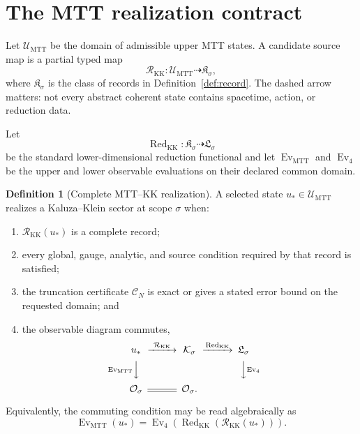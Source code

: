\documentclass[11pt]{article}
\theoremstyle{definition}
\newtheorem{definition}[theorem]{Definition}
\theoremstyle{remark}
\newcommand{\cC}{\mathcal C}
\newcommand{\cK}{\mathcal K}
\newcommand{\cO}{\mathcal O}
\newcommand{\cR}{\mathcal R}
\newcommand{\cU}{\mathcal U}
\let\MTToriginalitem\item
\renewcommand{\item}{\par\MTToriginalitem}
\begin{document}
\section{The MTT realization contract}
\label{sec:contract}

Let \(\cU_{\mathrm{MTT}}\) be the domain of admissible upper MTT states.  A
candidate source map is a partial typed map
\[
  \cR_{\mathrm{KK}}:
  \cU_{\mathrm{MTT}}\dashrightarrow \mathfrak K_\sigma ,
\]
where \(\mathfrak K_\sigma\) is the class of records in
Definition~\ref{def:record}.  The dashed arrow matters: not every abstract coherent
state contains spacetime, action, or reduction data.

Let
\[
 \operatorname{Red}_{\mathrm{KK}}:\mathfrak K_\sigma
 \dashrightarrow \mathfrak L_\sigma
\]
be the standard lower-dimensional reduction functional and let
\(\operatorname{Ev}_{\mathrm{MTT}}\) and
\(\operatorname{Ev}_4\) be the upper and lower observable evaluations on
their declared common domain.

\begin{definition}[Complete MTT--KK realization]
\label{def:realization}
A selected state \(u_\ast\in\cU_{\mathrm{MTT}}\) realizes a
Kaluza--Klein sector at scope \(\sigma\) when:
\begin{enumerate}[label=(\roman*),leftmargin=2em]
\item \(\cR_{\mathrm{KK}}(u_\ast)\) is a complete record;
\item every global, gauge, analytic, and source condition required by that
      record is satisfied;
\item the truncation certificate \(\cC_N\) is exact or gives a stated error
      bound on the requested domain; and
\item the observable diagram commutes,
\[
\begin{CD}
u_\ast @>{\cR_{\mathrm{KK}}}>>
       \cK_\sigma @>{\operatorname{Red}_{\mathrm{KK}}}>>
       \mathfrak L_\sigma\\
@V{\operatorname{Ev}_{\mathrm{MTT}}}VV
&& @VV{\operatorname{Ev}_4}V\\
\cO_\sigma @= \cO_\sigma .
\end{CD}
\]
\end{enumerate}
\end{definition}

Equivalently, the commuting condition may be read algebraically as
\[
 \operatorname{Ev}_{\mathrm{MTT}}(u_\ast)
 =
 \operatorname{Ev}_4\!\left(
 \operatorname{Red}_{\mathrm{KK}}
 (\cR_{\mathrm{KK}}(u_\ast))\right).
\]
\end{document}

